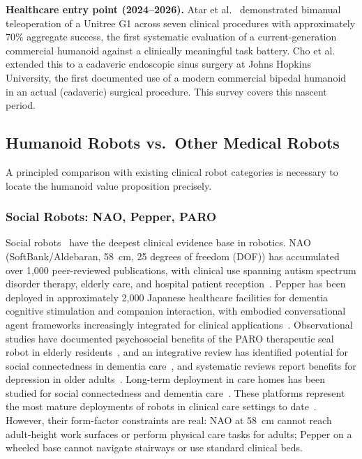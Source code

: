 \documentclass[acmsmall]{acmart}
\begin{document}
\textbf{Healthcare entry point (2024--2026).} Atar et al.~\cite{atar2025humanoids}
demonstrated bimanual teleoperation of a Unitree G1 across seven clinical
procedures with approximately 70\% aggregate success, the first systematic
evaluation of a current-generation commercial humanoid against a clinically
meaningful task battery. Cho et al.~\cite{cho2026humanoid} extended this to a
cadaveric endoscopic sinus surgery at Johns Hopkins University, the first
documented use of a modern commercial bipedal humanoid in an actual (cadaveric)
surgical procedure. This survey covers this nascent period.

\subsection{Humanoid Robots vs.\ Other Medical Robots}
\label{sec:alternatives}

A principled comparison with existing clinical robot categories is necessary to
locate the humanoid value proposition precisely.

\subsubsection{Social Robots: NAO, Pepper, PARO}

Social robots~\cite{fong2003survey,dautenhahn2007socially} have the deepest
clinical evidence base in robotics. NAO
(SoftBank/Aldebaran, 58~cm, 25 degrees of freedom (DOF)) has accumulated over
1,000 peer-reviewed
publications, with clinical use spanning autism spectrum disorder therapy,
elderly care, and hospital patient reception~\cite{cabibihan2013robots}. Pepper
has been deployed in approximately 2,000 Japanese healthcare facilities for
dementia cognitive stimulation and companion interaction, with embodied
conversational agent frameworks increasingly integrated for clinical
applications~\cite{provoost2017embodied,sorensen2025humanoid,cunha2025humanoid}.
Observational studies have documented psychosocial benefits of the PARO therapeutic
seal robot in elderly residents~\cite{wada2007living}, and an integrative review
has identified potential for social connectedness in dementia
care~\cite{moyle2017telepresence}, and systematic reviews report benefits for
depression in older adults~\cite{chen2018social}. Long-term deployment in care homes has been
studied for social connectedness and dementia care~\cite{moyle2014dementia}.
These platforms represent the most mature deployments of robots in clinical care
settings to date~\cite{abdi2018scoping}. However, their form-factor constraints are real: NAO at 58~cm cannot
reach adult-height work surfaces or perform physical care tasks for adults; Pepper
on a wheeled base cannot navigate stairways or use standard clinical beds.
\end{document}
